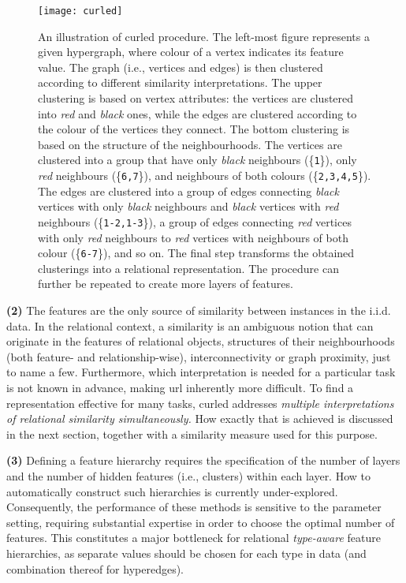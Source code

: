 \begin{sidewaysfigure}
  \centering
  \medskip
  \texttt{[image: curled]}
  \caption{An illustration of \gls{curled} procedure. The left-most figure represents a given hypergraph, where colour of a vertex indicates its feature value. The graph (i.e., vertices and edges) is then clustered according to different similarity interpretations. The upper clustering is based on vertex attributes: the vertices are clustered into \textit{red} and \textit{black} ones, while the edges are clustered according to the colour of the vertices they connect. The bottom clustering is based on the structure of the neighbourhoods. The vertices are clustered into a group that have only \textit{black} neighbours (\{{\tt1}\}), only \textit{red} neighbours (\{{\tt 6,7}\}), and neighbours of both colours (\{{\tt 2,3,4,5}\}). The edges are clustered into a group of edges connecting \textit{black} vertices with only \textit{black} neighbours and \textit{black} vertices with \textit{red} neighbours (\{{\tt1-2,1-3}\}), a group of edges connecting \textit{red} vertices with only \textit{red} neighbours to \textit{red} vertices with neighbours of both colour (\{{\tt6-7}\}), and so on. The final step transforms the obtained clusterings into a relational representation. The procedure can further be repeated to create more layers of features. }
  \label{fig:curled}
\end{sidewaysfigure}


\textbf{(2)}
The features are the only source of similarity between instances in the i.i.d. data.
In the relational context, a similarity is an ambiguous notion that can originate in the  features of relational objects, structures of their neighbourhoods (both feature- and relationship-wise), interconnectivity or graph proximity, just to name a few.
Furthermore, which interpretation is needed for a particular task is not known in advance, making \gls{url} inherently more difficult.
To find a representation effective for many tasks, \gls{curled} addresses \textit{multiple interpretations of relational similarity simultaneously.}
How exactly that is achieved is discussed in the next section, together with a similarity measure used for this purpose.



\textbf{(3)}
Defining a feature hierarchy requires the specification of the number of layers and the number of hidden features (i.e., clusters) within each layer.
How to automatically construct such hierarchies is currently under-explored.
Consequently, the performance of these methods is sensitive to the parameter setting, requiring substantial expertise in order to choose the optimal number of features.
This constitutes a major bottleneck for relational \textit{type-aware} feature hierarchies, as separate values should be chosen for each type in data (and combination thereof for hyperedges).

